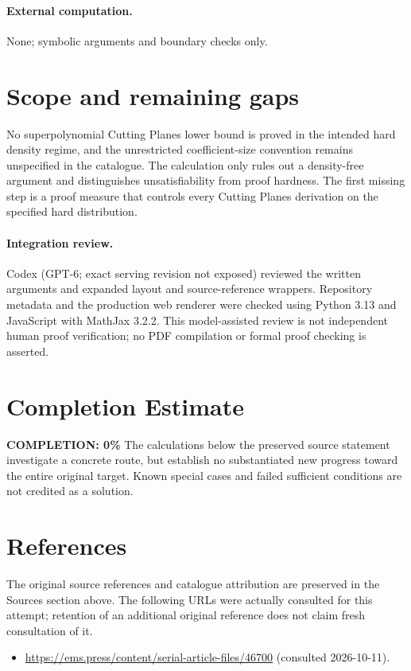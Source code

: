 \documentclass[11pt]{article}
\begin{document}
\paragraph{External computation.} None; symbolic arguments and boundary checks only.
\section{Scope and remaining gaps}
No superpolynomial Cutting Planes lower bound is proved in the intended hard density regime, and the unrestricted coefficient-size convention remains unspecified in the catalogue. The calculation only rules out a density-free argument and distinguishes unsatisfiability from proof hardness. The first missing step is a proof measure that controls every Cutting Planes derivation on the specified hard distribution.
\paragraph{Integration review.} Codex (GPT-6; exact serving revision not exposed) reviewed the written arguments and expanded layout and source-reference wrappers. Repository metadata and the production web renderer were checked using Python 3.13 and JavaScript with MathJax 3.2.2. This model-assisted review is not independent human proof verification; no PDF compilation or formal proof checking is asserted.

\section{Completion Estimate}
\noindent\textbf{COMPLETION: 0\%}
The calculations below the preserved source statement investigate a concrete route,
but establish no substantiated new progress toward the entire original target.
Known special cases and failed sufficient conditions are not credited as a solution.
\section{References}
The original source references and catalogue attribution are preserved in the
Sources section above. The following URLs were actually consulted for this attempt;
retention of an additional original reference does not claim fresh consultation of it.
\begin{itemize}
\item \url{https://ems.press/content/serial-article-files/46700} (consulted 2026-10-11). 
\end{itemize}
\end{document}
